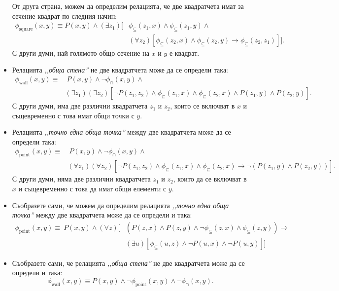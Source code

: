 \begin{example}
\begin{itemize}
    От друга страна, можем да определим релацията, че две квадратчета имат за сечение квадрат по следния начин:
    \begin{align*}
      \phi_{\text{square}}(x,y) \equiv P(x,y) \land (\exists z_1)[ & \phi_{\subseteq}(z_1,x) \land \phi_{\subseteq}(z_1,y) \land \\
                                                    & (\forall z_2)[\phi_{\subseteq}(z_2,x) \land \phi_{\subseteq}(z_2,y) \to \phi_{\subseteq}(z_2,z_1)]].
    \end{align*}
    С други думи, най-голямото общо сечение на $x$ и $y$ е квадрат.
  \item
    Релацията \emph{,,обща стена''} не две квадратчета може да се определи така:
    \begin{align*}
      \phi_{\text{wall}}(x,y) \equiv & \ P(x,y) \land \neg \phi_{\cap}(x,y) \land\\
                                     & (\exists z_1)(\exists z_2)[\neg P(z_1,z_2) \land \phi_{\subseteq}(z_1,x) \land \phi_{\subseteq}(z_2,x) \land P(z_1,y)\land P(z_2,y)].
    \end{align*}
    С други думи, има две различни квадратчета $z_1$ и $z_2$, които се включват в $x$ и същевременно с това имат общи точки с $y$.
  \item
    Релацията \emph{,,точно една обща точка''} между две квадратчета може да се определи така:
    \begin{align*}
      \phi_{\text{point}}(x,y) \equiv & \ P(x,y) \land \neg \phi_{\cap}(x,y) \land\\
                                      & (\forall z_1)(\forall z_2)[\neg P(z_1,z_2) \land \phi_{\subseteq}(z_1,x) \land \phi_{\subseteq}(z_2,x) \to \neg(P(z_1,y)\land P(z_2,y))].
    \end{align*}
    С други думи, няма две различни квадратчета $z_1$ и $z_2$, които да се включват в $x$ и същевременно с това да имат общи елементи с $y$.
  \item
    Съобразете сами, че можем да определим релацията \emph{,,точно една обща точка''} между две квадратчета може да се определи и така:
    \begin{align*}
      \phi_{\text{point}}(x,y) \equiv \ P(x,y) \land (\forall z)[ & ( P(z,x) \land P(z,y) \land \neg \phi_{\subseteq}(z,x) \land \phi_{\subseteq}(z,y)) \to \\
                                                                  & (\exists u)[\phi_{\subseteq}(u,z) \land \neg P(u,x) \land \neg P(u,y)]] 
    \end{align*}
  \item
    Съобразете сами, че релацията \emph{,,обща стена''} не две квадратчета може да се определи и така:
    \[\phi_{\text{wall}}(x,y) \equiv P(x,y) \land \neg \phi_{\text{point}}(x,y) \land \neg \phi_{\cap}(x,y).\]
  \end{itemize}
\end{example}

